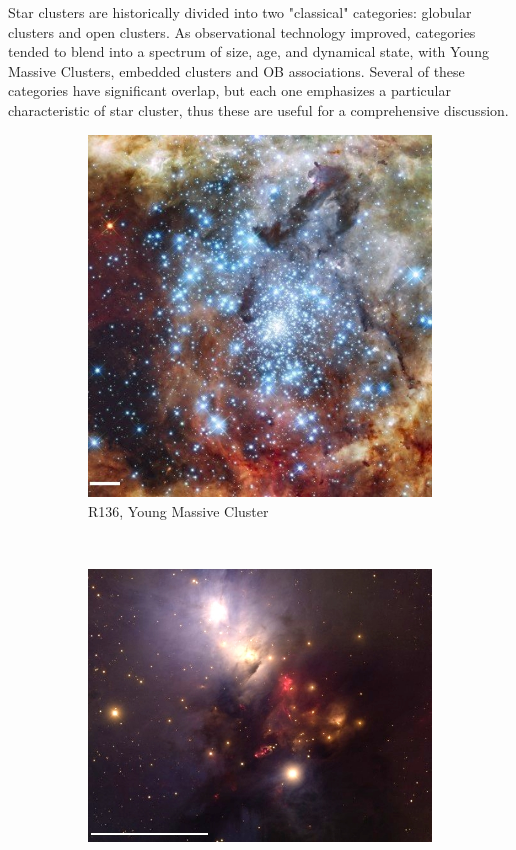 Star clusters are historically divided into two "classical" categories: globular clusters and open clusters. As observational technology improved, categories tended to blend into a spectrum of size, age, and dynamical state, with Young Massive Clusters, embedded clusters and OB associations. Several of these categories have significant overlap, but each one emphasizes a particular characteristic of star cluster, thus these are useful for a comprehensive discussion.


\begin{figure}
	 \begin{subfigure}[b]{0.415\textwidth}
        \includegraphics[width=\textwidth]{Figures/0_R136_scale.jpg}
        \caption{R136, Young Massive Cluster}
        \label{Fig:0_openglobular2.ymc}
    \end{subfigure}
    ~ 
    \begin{subfigure}[b]{0.55\textwidth}
        \includegraphics[width=\textwidth]{Figures/0_NGC1333_scale_contrast.jpg}

\end{subfigure}
\end{figure}

